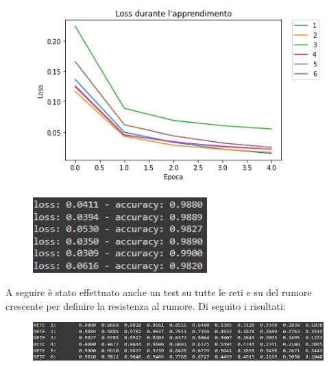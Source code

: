 \documentclass[12pt, a4paper]{article}
\begin{document}
\begin{figure}[H]
    \centering 
    \includegraphics[width=.9\textwidth]{ConfrontoConvoluzionale.png}
\end{figure}
\begin{figure}[H]
    \centering
    \includegraphics[width=0.6\textwidth]{AccuratezzaConvoluzionale.png}
\end{figure}

A seguire è stato effettuato anche un test su tutte le reti e su del rumore crescente per definire la resistenza al rumore. Di seguito i risultati:
\begin{figure}[H]
    \centering
    \includegraphics[width=\textwidth]{RisultatiRumoreConvoluzionale.png}
\end{figure}

\newpage
\end{document}
